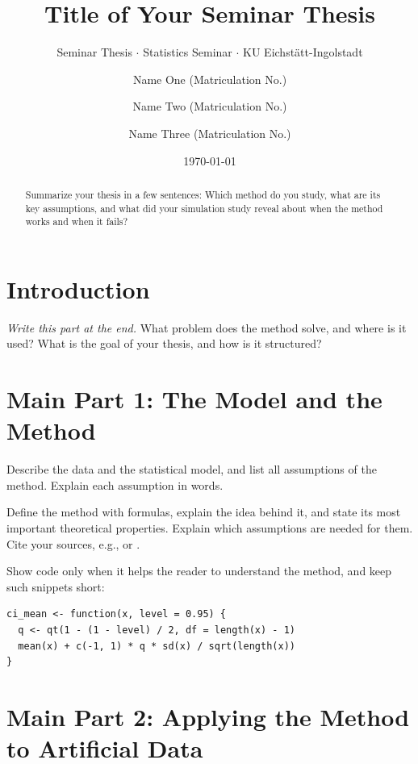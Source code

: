 \documentclass[12pt, a4paper]{scrartcl}
\title{Title of Your Seminar Thesis}
\subtitle{Seminar Thesis $\cdot$ Statistics Seminar $\cdot$ KU Eichstätt-Ingolstadt}
\author{Name One (Matriculation No.) \and
        Name Two (Matriculation No.) \and
        Name Three (Matriculation No.)}
\date{\today}
\begin{document}
\maketitle

\begin{abstract}
  Summarize your thesis in a few sentences: Which method do you study,
  what are its key assumptions, and what did your simulation study reveal
  about when the method works and when it fails?
\end{abstract}

\tableofcontents
\newpage


\section{Introduction}

\emph{Write this part at the end.} What problem does the method solve, and
where is it used? What is the goal of your thesis, and how is it structured?

\section{Main Part 1: The Model and the Method}

Describe the data and the statistical model, and list all assumptions of the
method. Explain each assumption in words.

Define the method with formulas, explain the idea behind it, and state its most
important theoretical properties. Explain which assumptions are needed for
them. Cite your sources, e.g., \textcite{Silverman1986} or
\parencite{Silverman1986}.

Show code only when it helps the reader to understand the method, and keep such
snippets short:

\begin{lstlisting}
ci_mean <- function(x, level = 0.95) {
  q <- qt(1 - (1 - level) / 2, df = length(x) - 1)
  mean(x) + c(-1, 1) * q * sd(x) / sqrt(length(x))
}
\end{lstlisting}

\section{Main Part 2: Applying the Method to Artificial Data}
\end{document}
